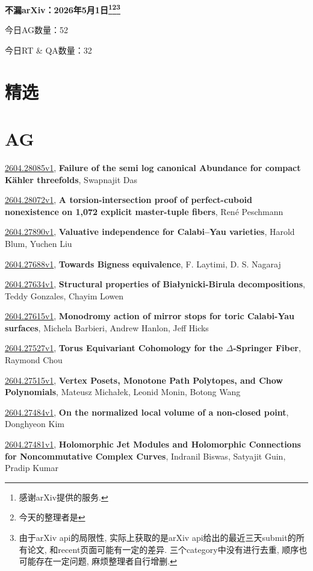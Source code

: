 \documentclass[9pt, a4paper]{article}
\theoremstyle{plain}
\theoremstyle{definition}
\theoremstyle{remark}
\newcommand{\arxiv}[3]{\href{https://arxiv.org/abs/#1}{#1}, \textbf{\textcolor{arxivblue}{#2}}, #3}
\newcommand{\AGnumber}{52}
\newcommand{\RTQAnumber}{32}
\newcommand{\NewestDate}{2026年5月1日}
\newcommand{\todayarXiver}{} %
\begin{document}
\begin{center}
    \Huge\textbf{不漏arXiv：\NewestDate\footnote{感谢arXiv提供的服务.}\footnote{今天的整理者是\todayarXiver}\footnote{由于arXiv api的局限性, 实际上获取的是arXiv api给出的最近三天submit的所有论文, 和recent页面可能有一定的差异. 三个category中没有进行去重, 顺序也可能存在一定问题, 麻烦整理者自行增删.}} \\
\end{center}

\setcounter{section}{-1}

\begin{center}
    今日AG数量：\AGnumber
    
    今日RT \& QA数量：\RTQAnumber
    
\end{center}


\section{精选}


\section{AG}
\arxiv{2604.28085v1}{Failure of the semi log canonical Abundance for compact Kähler threefolds}{Swapnajit Das}

\arxiv{2604.28072v1}{A torsion-intersection proof of perfect-cuboid nonexistence on 1,072 explicit master-tuple fibers}{René Peschmann}

\arxiv{2604.27890v1}{Valuative independence for Calabi--Yau varieties}{Harold Blum, Yuchen Liu}

\arxiv{2604.27688v1}{Towards Bigness equivalence}{F. Laytimi, D. S. Nagaraj}

\arxiv{2604.27634v1}{Structural properties of Białynicki-Birula decompositions}{Teddy Gonzales, Chayim Lowen}

\arxiv{2604.27615v1}{Monodromy action of mirror stops for toric Calabi-Yau surfaces}{Michela Barbieri, Andrew Hanlon, Jeff Hicks}

\arxiv{2604.27527v1}{Torus Equivariant Cohomology for the $Δ$-Springer Fiber}{Raymond Chou}

\arxiv{2604.27515v1}{Vertex Posets, Monotone Path Polytopes, and Chow Polynomials}{Mateusz Michałek, Leonid Monin, Botong Wang}

\arxiv{2604.27484v1}{On the normalized local volume of a non-closed point}{Donghyeon Kim}

\arxiv{2604.27481v1}{Holomorphic Jet Modules and Holomorphic Connections for Noncommutative Complex Curves}{Indranil Biswas, Satyajit Guin, Pradip Kumar}
\end{document}
